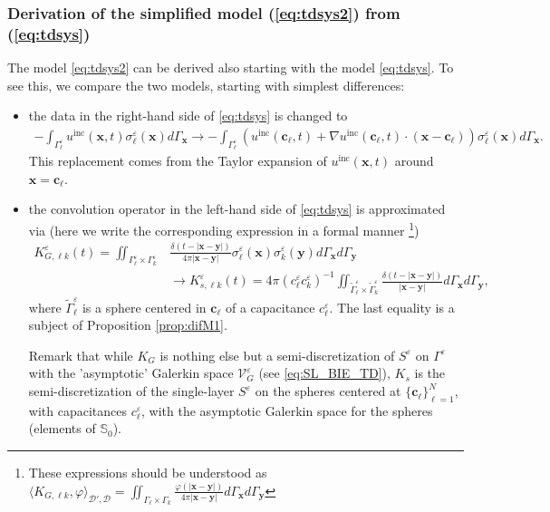 \documentclass[]{article}
\numberwithin{equation}{section}
\numberwithin{theorem}{section}
\numberwithin{lemma}{section}
\numberwithin{corollary}{section}
\numberwithin{proposition}{section}
\numberwithin{definition}{section}
\newcommand{\bx}{\boldsymbol{x}}
\newcommand{\by}{\boldsymbol{y}}
\newcommand{\re}{\varepsilon}
\renewcommand{\vec}{\boldsymbol}
\begin{document}
	\subsubsection{Derivation of the simplified model (\ref{eq:tdsys2}) from (\ref{eq:tdsys})}
	The model \eqref{eq:tdsys2} can be derived also starting with the model \eqref{eq:tdsys}. To see this, we compare the two models, starting with simplest differences: 
	\begin{itemize}[leftmargin=*]
		\item the data in the right-hand side of \eqref{eq:tdsys} is changed to
		\begin{align*}%
			-\int_{\Gamma^{\re}_{\ell}}u^{\operatorname{inc}}(\vec{x},t)\sigma^{\re}_{\ell}(\vec{x})d\Gamma_{\vec{x}}\rightarrow -\int_{\Gamma^{\re}_{\ell}}(u^{\operatorname{inc}}(\vec{c}_{\ell},t)+\nabla u^{\operatorname{inc}}(\vec{c}_{\ell}, t)\cdot (\vec{x}-\vec{c}_{\ell}))\sigma^{\re}_{\ell}(\vec{x})d\Gamma_{\vec{x}}.
		\end{align*}
		This replacement comes from the Taylor expansion of $u^{\operatorname{inc}}(\vec{x},t)$ around $\vec{x}=\vec{c}_{\ell}$.
		\item the convolution operator in the left-hand side of \eqref{eq:tdsys} is approximated via (here we write the corresponding expression in a formal manner \footnote{These expressions should be understood as $\langle K_{G,\ell k}, \varphi\rangle_{\mathcal{D}', \mathcal{D}}=\iint_{\Gamma_{\ell}\times\Gamma_k}\frac{\varphi(|\bx-\by|)}{4\pi|\bx-\by|}d\Gamma_{\bx}d\Gamma_{\by}$})
		\begin{align}
			\label{eq:K_s_lk}
			K^{\re}_{G, \ell k}(t) = \iint_{\Gamma_{\ell}^{\re}\times \Gamma_k^{\re}}&\frac{\delta(t-|\vec{x}-\vec{y}|)}{4\pi|\vec{x}-\vec{y}|}\sigma^{\re}_{\ell}(\vec{x})\sigma^{\re}_k(\vec{y})d\Gamma_{\vec{x}}d\Gamma_{\vec{y}} \nonumber \\	
			&\rightarrow K^{\re}_{s, \ell k}(t) = 4\pi  (c^{\re}_{\ell} c^{\re}_k)^{-1} \iint_{\widetilde{\Gamma}_{\ell}^{\re}\times \widetilde{\Gamma}_k^{\re}}\frac{\delta(t-|\vec{x}-\vec{y}|)}{|\vec{x}-\vec{y}|}d\Gamma_{\vec{x}}d\Gamma_{\vec{y}},
		\end{align} 
		where $\tilde{\Gamma}_{\ell}^{\re}$ is a sphere centered in $\vec{c}_{\ell}$ of a capacitance $c_{\ell}^{\re}$. The last equality is a subject of Proposition \ref{prop:difM1}. 
		
		Remark that while $K_G$ is nothing else but a semi-discretization of  ${S}^{\re}$ on $\Gamma^{\re}$ with the 'asymptotic' Galerkin space $\mathcal{V}_{G}^{\re}$ (see \eqref{eq:SL_BIE_TD}), $K_s$ is the semi-discretization of the single-layer $S^{\re}$ on the spheres centered at $\{\vec{c}_{\ell}\}_{\ell=1}^N$, with capacitances $c_{\ell}^{\re}$, with the asymptotic Galerkin space for the spheres (elements of $\mathbb{S}_0$).
		

\end{itemize}
\end{document}
